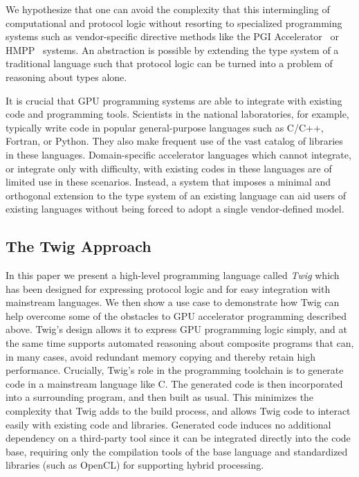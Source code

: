 We hypothesize that one can avoid the complexity that this intermingling of
computational and protocol logic without resorting to specialized programming
systems such as vendor-specific directive methods like the PGI
Accelerator~\cite{pgi-accelerate} or HMPP~\cite{hmpp} systems. An abstraction is
possible by extending the type system of a traditional language such that
protocol logic can be turned into a problem of reasoning about types alone.

It is crucial that GPU programming systems are able to integrate with existing
code and programming tools. Scientists in the national laboratories, for
example, typically write code in popular general-purpose languages such as
C/C++, Fortran, or Python. They also make frequent use of the vast catalog of
libraries in these languages. Domain-specific accelerator languages which cannot
integrate, or integrate only with difficulty, with existing codes in these
languages are of limited use in these scenarios. Instead, a system that imposes
a minimal and orthogonal extension to the type system of an existing language
can aid users of existing languages without being forced to adopt a single
vendor-defined model.

\subsection{The Twig Approach}

In this paper we present a high-level programming language called \emph{Twig}
which has been designed for expressing protocol logic and for easy integration
with mainstream languages. We then show a use case to demonstrate how Twig can
help overcome some of the obstacles to GPU accelerator programming described
above. Twig's design allows it to express GPU programming logic simply, and at
the same time supports automated reasoning about composite programs that can, in
many cases, avoid redundant memory copying and thereby retain high performance.
Crucially, Twig's role in the programming toolchain is to generate code in a
mainstream language like C. The generated code is then incorporated into a
surrounding program, and then built as usual. This minimizes the complexity that
Twig adds to the build process, and allows Twig code to interact easily with
existing code and libraries. Generated code induces no additional dependency on
a third-party tool since it can be integrated directly into the code base,
requiring only the compilation tools of the base language and standardized
libraries (such as OpenCL) for supporting hybrid processing.

